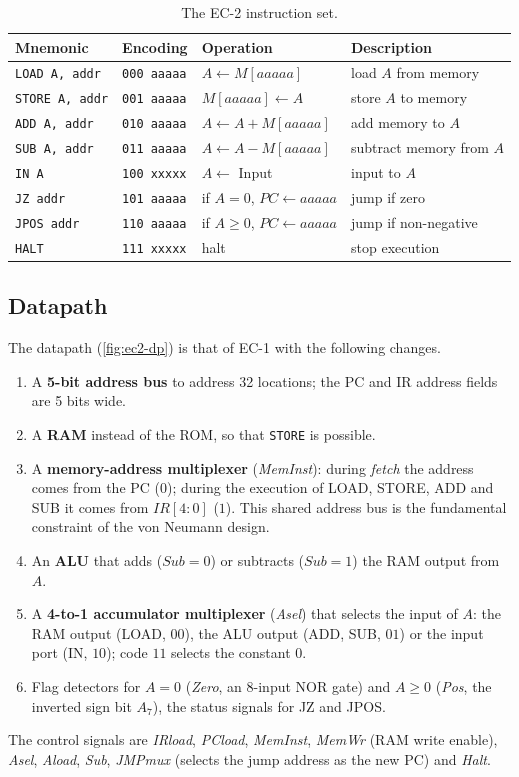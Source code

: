 \begin{table}[htbp]
\centering
\caption{The EC-2 instruction set.}
\label{tab:ec2-is}
\begin{tabular}{llll}
\toprule
Mnemonic & Encoding & Operation & Description\\ \midrule
\texttt{LOAD A, addr} & \texttt{000 aaaaa} & $A\leftarrow M[aaaaa]$ & load $A$ from memory\\
\texttt{STORE A, addr} & \texttt{001 aaaaa} & $M[aaaaa]\leftarrow A$ & store $A$ to memory\\
\texttt{ADD A, addr} & \texttt{010 aaaaa} & $A\leftarrow A+M[aaaaa]$ & add memory to $A$\\
\texttt{SUB A, addr} & \texttt{011 aaaaa} & $A\leftarrow A-M[aaaaa]$ & subtract memory from $A$\\
\texttt{IN A} & \texttt{100 xxxxx} & $A\leftarrow$ Input & input to $A$\\
\texttt{JZ addr} & \texttt{101 aaaaa} & if $A=0$, $PC\leftarrow aaaaa$ & jump if zero\\
\texttt{JPOS addr} & \texttt{110 aaaaa} & if $A\ge0$, $PC\leftarrow aaaaa$ & jump if non-negative\\
\texttt{HALT} & \texttt{111 xxxxx} & halt & stop execution\\ \bottomrule
\end{tabular}
\end{table}

\subsection{Datapath}
The datapath (\cref{fig:ec2-dp}) is that of EC-1 with the following changes.
\begin{enumerate}
  \item A \textbf{5-bit address bus} to address 32 locations; the PC and IR address fields are 5 bits wide.
  \item A \textbf{RAM} instead of the ROM, so that \texttt{STORE} is possible.
  \item A \textbf{memory-address multiplexer} (\textit{MemInst}): during \emph{fetch} the address comes from the PC ($0$); during the execution of LOAD, STORE, ADD and SUB it comes from $IR[4:0]$ ($1$). This shared address bus is the fundamental constraint of the von Neumann design.
  \item An \textbf{ALU} that adds ($\mathit{Sub}=0$) or subtracts ($\mathit{Sub}=1$) the RAM output from $A$.
  \item A \textbf{4-to-1 accumulator multiplexer} (\textit{Asel}) that selects the input of $A$: the RAM output (LOAD, $00$), the ALU output (ADD, SUB, $01$) or the input port (IN, $10$); code $11$ selects the constant 0.
  \item Flag detectors for $A=0$ (\textit{Zero}, an 8-input NOR gate) and $A\ge0$ (\textit{Pos}, the inverted sign bit $A_7$), the status signals for JZ and JPOS.
\end{enumerate}
The control signals are \textit{IRload}, \textit{PCload}, \textit{MemInst}, \textit{MemWr} (RAM write enable), \textit{Asel}, \textit{Aload}, \textit{Sub}, \textit{JMPmux} (selects the jump address as the new PC) and \textit{Halt}.

